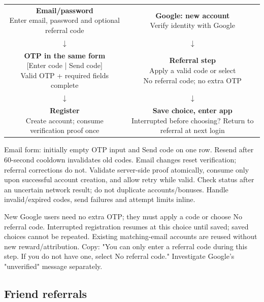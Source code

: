 \documentclass[11pt,a4paper]{article}
\newcommand{\flowbox}[2]{\fbox{\parbox[c]{#1}{\centering\small #2}}}
\begin{document}
\begin{center}
\begin{tabular}{@{}c@{\hspace{5mm}}c@{}}
\flowbox{70mm}{\textbf{Email/password}\\Enter email, password and optional referral code} & \flowbox{70mm}{\textbf{Google: new account}\\Verify identity with Google} \\
$\downarrow$ & $\downarrow$ \\
\flowbox{70mm}{\textbf{OTP in the same form}\\{}[Enter code | Send code]\\Valid OTP + required fields complete} & \flowbox{70mm}{\textbf{Referral step}\\Apply a valid code or select\\No referral code; no extra OTP} \\
$\downarrow$ & $\downarrow$ \\
\flowbox{70mm}{\textbf{Register}\\Create account; consume verification proof once} & \flowbox{70mm}{\textbf{Save choice, enter app}\\Interrupted before choosing? Return to referral at next login} \\
\end{tabular}
\end{center}

Email form: initially empty OTP input and Send code on one row. Resend after 60-second cooldown invalidates old codes. Email changes reset verification; referral corrections do not. Validate server-side proof atomically, consume only upon successful account creation, and allow retry while valid. Check status after an uncertain network result; do not duplicate accounts/\allowbreak{}bonuses. Handle invalid/\allowbreak{}expired codes, send failures and attempt limits inline.

New Google users need no extra OTP; they must apply a code or choose No referral code. Interrupted registration resumes at this choice until saved; saved choices cannot be repeated. Existing matching-email accounts are reused without new reward/\allowbreak{}attribution. Copy: "You can only enter a referral code during this step. If you do not have one, select No referral code." Investigate Google's "unverified" message separately.

\subsection*{Friend referrals}
\end{document}
